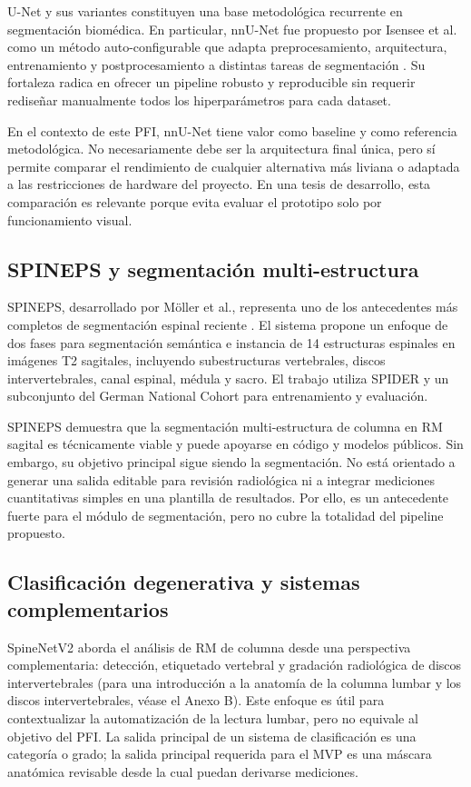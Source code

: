U-Net y sus variantes constituyen una base metodológica recurrente en segmentación biomédica. En particular, nnU-Net fue propuesto por Isensee et al. como un método auto-configurable que adapta preprocesamiento, arquitectura, entrenamiento y postprocesamiento a distintas tareas de segmentación \parencite{isensee_nnunet_2021}. Su fortaleza radica en ofrecer un pipeline robusto y reproducible sin requerir rediseñar manualmente todos los hiperparámetros para cada dataset.

En el contexto de este PFI, nnU-Net tiene valor como baseline y como referencia metodológica. No necesariamente debe ser la arquitectura final única, pero sí permite comparar el rendimiento de cualquier alternativa más liviana o adaptada a las restricciones de hardware del proyecto. En una tesis de desarrollo, esta comparación es relevante porque evita evaluar el prototipo solo por funcionamiento visual.

\subsection{SPINEPS y segmentación multi-estructura}

SPINEPS, desarrollado por Möller et al., representa uno de los antecedentes más completos de segmentación espinal reciente \parencite{moller_spineps_2025}. El sistema propone un enfoque de dos fases para segmentación semántica e instancia de 14 estructuras espinales en imágenes T2 sagitales, incluyendo subestructuras vertebrales, discos intervertebrales, canal espinal, médula y sacro. El trabajo utiliza SPIDER y un subconjunto del German National Cohort para entrenamiento y evaluación.

SPINEPS demuestra que la segmentación multi-estructura de columna en RM sagital es técnicamente viable y puede apoyarse en código y modelos públicos. Sin embargo, su objetivo principal sigue siendo la segmentación. No está orientado a generar una salida editable para revisión radiológica ni a integrar mediciones cuantitativas simples en una plantilla de resultados. Por ello, es un antecedente fuerte para el módulo de segmentación, pero no cubre la totalidad del pipeline propuesto.

\subsection{Clasificación degenerativa y sistemas complementarios}

SpineNetV2 aborda el análisis de RM de columna desde una perspectiva complementaria: detección, etiquetado vertebral y gradación radiológica de discos intervertebrales \parencite{jamaludin_spinenet_2017,windsor_spinenet_2024} (para una introducción a la anatomía de la columna lumbar y los discos intervertebrales, véase el Anexo B). Este enfoque es útil para contextualizar la automatización de la lectura lumbar, pero no equivale al objetivo del PFI. La salida principal de un sistema de clasificación es una categoría o grado; la salida principal requerida para el MVP es una máscara anatómica revisable desde la cual puedan derivarse mediciones.


